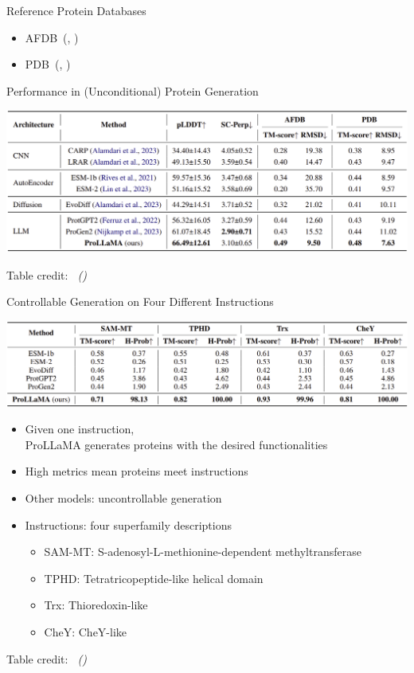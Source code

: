 \documentclass[dvipsnames,
hyperref={colorlinks,citecolor=black}
]{beamer}
\newcommand{\credit}[2]{\par\hfill \tiny #1 credit:~\itshape\citeauthor{#2} (\citeyear{#2})}
\renewcommand{\cite}[1]{(\citeauthor{#1}, \citeyear{#1})}
\begin{document}
\begin{frame}{Reference Protein Databases}
	\begin{itemize}
		\item AFDB~\cite{varadi2022alphafold}
		\item PDB~\cite{berman2002protein}
	\end{itemize}
\end{frame}

\begin{frame}{Performance in (Unconditional) Protein Generation}
	\begin{center}
		\includegraphics[scale=0.21]{tables/methods_comparison.png}
	\end{center}
	\credit{Table}{lv2024prollama}
\end{frame}

\begin{frame}{Controllable Generation on Four Different Instructions}
	\begin{center}
		\includegraphics[scale=0.21]{tables/controlled_generation_comparison.png}
	\end{center}
	\begin{itemize}
		\item Given one instruction, \\ProLLaMA generates proteins with the desired functionalities
		\item High metrics mean proteins meet instructions
		\item Other models: uncontrollable generation
		\item Instructions: four superfamily descriptions
		\begin{itemize}
			\item SAM-MT: S-adenosyl-L-methionine-dependent methyltransferase
			\item TPHD: Tetratricopeptide-like helical domain
			\item Trx: Thioredoxin-like 
			\item CheY: CheY-like
		\end{itemize}
	\end{itemize}
	\credit{Table}{lv2024prollama}
\end{frame}
\end{document}
